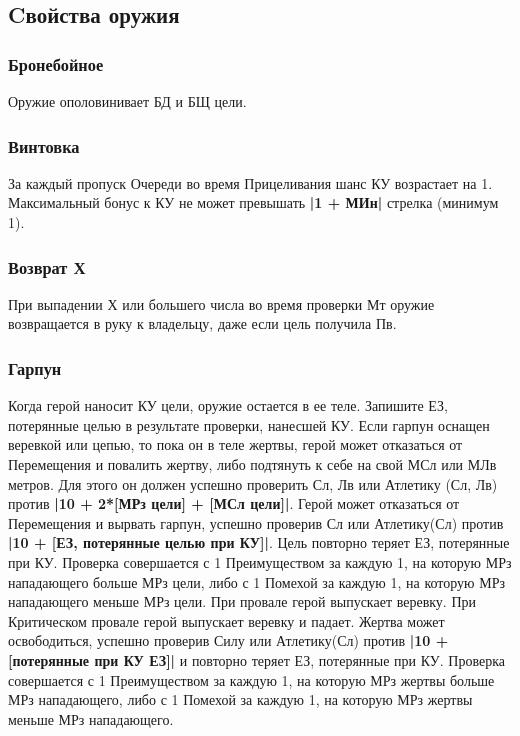 \subsection{Cвойства оружия}
\subsubsection{Бронебойное} Оружие ополовинивает БД и БЩ цели.
\subsubsection{Винтовка} За каждый пропуск Очереди во время Прицеливания шанс КУ возрастает на 1. Максимальный бонус к КУ не может превышать \textbf{|1 + МИн|} стрелка (минимум 1).
\subsubsection{Возврат Х} При выпадении Х или большего числа во время проверки Мт оружие возвращается в руку к владельцу, даже если цель получила Пв.
\subsubsection{Гарпун} Когда герой наносит КУ цели, оружие остается в ее теле. Запишите ЕЗ, потерянные целью в результате проверки, нанесшей КУ.
\newline Если гарпун оснащен веревкой или цепью, то пока он в теле жертвы, герой может отказаться от Перемещения и повалить жертву, либо подтянуть к себе на свой МСл или МЛв метров.  Для этого он должен успешно проверить Сл, Лв или Атлетику (Сл, Лв) против \textbf{|10 + 2*[МРз цели] + [МСл цели]|}. 
\newline Герой может отказаться от Перемещения  и вырвать гарпун, успешно проверив Сл или Атлетику(Сл) против \textbf{|10 + [ЕЗ, потерянные целью при КУ]|}. Цель повторно теряет ЕЗ, потерянные при КУ.
\newline Проверка совершается с 1 Преимуществом за каждую 1, на которую МРз нападающего больше МРз цели, либо с 1 Помехой за каждую 1, на которую МРз нападающего меньше МРз цели.
\newline При провале герой выпускает веревку. При Критическом провале герой выпускает веревку и падает.
\newline Жертва может освободиться, успешно проверив Силу или Атлетику(Сл) против \textbf{|10 + [потерянные при КУ ЕЗ]|} и повторно теряет ЕЗ, потерянные при КУ. 
\newline Проверка совершается с 1 Преимуществом за каждую 1, на которую МРз жертвы больше МРз нападающего, либо с 1 Помехой за каждую 1, на которую МРз жертвы меньше МРз нападающего.
